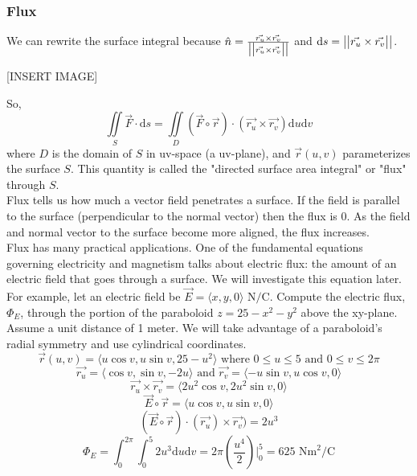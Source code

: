 \subsubsection{Flux}
\noindent
We can rewrite the surface integral because $\hat{n} = \frac{\vec{r_u} \times \vec{r_v}}{\big\lvert \big\lvert \vec{r_u} \times \vec{r_v} \big\rvert \big\rvert}$ and $\mathrm{d}s = \big\lvert \big\lvert \vec{r_u} \times \vec{r_v} \big\rvert \big\rvert$.

[INSERT IMAGE]

\noindent
So,
\begin{equation*}
	\iint\limits_{S}{\vec{F} \cdot \mathrm{d}s} = \iint\limits_{D}{\left(\vec{F}\circ\vec{r}\right) \cdot \left(\vec{r_u} \times \vec{r_v}\right)\mathrm{d}u\mathrm{d}v}
\end{equation*}
where $D$ is the domain of $S$ in uv-space (a uv-plane), and $\vec{r}(u,v)$ parameterizes the surface $S$. This quantity is called the "directed surface area integral" or "flux" through $S$.\\

\noindent
Flux tells us how much a vector field penetrates a surface. If the field is parallel to the surface (perpendicular to the normal vector) then the flux is 0. As the field and normal vector to the surface become more aligned, the flux increases. \\

\noindent
Flux has many practical applications. One of the fundamental equations governing electricity and magnetism talks about electric flux: the amount of an electric field that goes through a surface. We will investigate this equation later.\\

\noindent
For example, let an electric field be $\vec{E} = \langle x, y, 0 \rangle \text{ N}/ \text{C}$. Compute the electric flux, $\Phi_{E}$, through the portion of the paraboloid $z=25-x^2-y^2$ above the xy-plane. Assume a unit distance of 1 meter.
\indent
We will take advantage of a paraboloid's radial symmetry and use cylindrical coordinates.
\begin{equation*}
	\vec{r}(u,v) = \langle u\cos{v}, u\sin{v}, 25 - u^2 \rangle \text{ where } 0 \leq u \leq 5 \text{ and } 0 \leq v \leq 2\pi\end{equation*}
\begin{equation*}
	\vec{r_u} = \langle \cos{v}, \sin{v}, -2u \rangle \text{ and } \vec{r_v}=\langle -u\sin{v}, u\cos{v}, 0 \rangle
\end{equation*}
\begin{equation*}
	\vec{r_u} \times \vec{r_v} = \langle 2u^2\cos{v}, 2u^2\sin{v}, 0 \rangle
\end{equation*}
\begin{equation*}
	\vec{E}\circ\vec{r} = \langle u\cos{v}, u\sin{v}, 0 \rangle
\end{equation*}
\begin{equation*}
	\left(\vec{E}\circ\vec{r}\right) \cdot (\vec{r_u}) \times \vec{r_v}) = 2u^3
\end{equation*}
\begin{equation*}
	\Phi_{E} = \int_{0}^{2\pi}{\int_{0}^{5}{2u^3\mathrm{d}u}\mathrm{d}v} = 2\pi\left(\frac{u^4}{2}\right)\rvert_{0}^{5} = 625\text{ Nm}^2/\text{C}
\end{equation*}